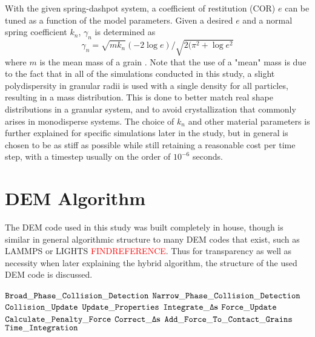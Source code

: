 With the given spring-dashpot system, a coefficient of restitution (COR) $e$ can be tuned as a function of the model parameters. Given a desired $e$ and a normal spring coefficient $k_n$, $\gamma_n$ is determined as
$$\gamma_n=\sqrt{mk_n}(-2\log{e})/\sqrt{2(\pi^2+\log{e}^2}$$
where $m$ is the mean mass of a grain \cite{Kamrin:2014}. Note that the use of a "mean" mass is due to the fact that in all of the simulations conducted in this study, a slight polydispersity in granular radii is used with a single density for all particles, resulting in a mass distribution. This is done to better match real shape distributions in a granular system, and to avoid crystallization that commonly arises in monodisperse systems. The choice of $k_n$ and other material parameters is further explained for specific simulations later in the study, but in general is chosen to be as stiff as possible while still retaining a reasonable cost per time step, with a timestep usually on the order of $10^{-6}$ seconds.

\section{DEM Algorithm}
The DEM code used in this study was built completely in house, though is similar in general algorithmic structure to many DEM codes that exist, such as LAMMPS or LIGHTS \textcolor{red}{FINDREFERENCE}. Thus for transparency as well as necessity when later explaining the hybrid algorithm, the structure of the used DEM code is discussed.

\begin{algorithm}
  \caption{${\tt Overall \_ DEM \_ Algorithm}$}
  \begin{algorithmic}[1]
  \State ${\tt Broad\_Phase\_Collision\_Detection}$
    \State ${\tt Narrow\_Phase\_Collision\_Detection}$
  \EndFor
  \State ${\tt Collision\_Update}$
    \State ${\tt Update\_Properties}$
    \State ${\tt Integrate\_\Delta\bold{s}}$
  \EndFor
  \State ${\tt Force\_Update}$ 
    \State ${\tt Calculate\_Penalty\_Force}$
    \State ${\tt Correct\_\Delta\bold{s}}$
    \State ${\tt Add\_Force\_To\_Contact\_Grains}$
  \EndFor
  \State ${\tt Time\_Integration}$ 
  \end{algorithmic}
  \label{alg:DEM_algorithm}
\end{algorithm}

